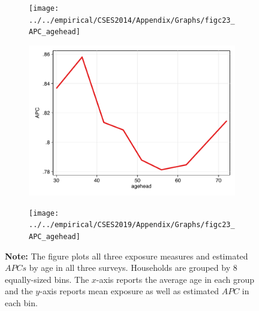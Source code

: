 \documentclass[11pt,letterpaper]{article}
\begin{document}
\begin{figure}
			\begin{subfigure}{.33\textwidth}
				\centering
				\texttt{[image: ../../empirical/CSES2014/Appendix/Graphs/figc23\_APC\_agehead]} 
				\vspace{-2.5em}
				\newline {}
			\end{subfigure}
			\begin{subfigure}{.33\textwidth}
				\centering
				\includegraphics[width=1\linewidth]{../../empirical/CSES2017/Appendix/Graphs/figc23_APC_agehead} 
				\vspace{-2.5em}
				\newline {}
			\end{subfigure}
			\begin{subfigure}{.33\textwidth}
				\centering
				\texttt{[image: ../../empirical/CSES2019/Appendix/Graphs/figc23\_APC\_agehead]} 
				\vspace{-2.5em}
				\newline {}
				
			\end{subfigure}
			
			
			\begin{tablenotes}
				\footnotesize
				\item \textbf{Note:} The figure plots all three exposure measures and estimated $APCs$ by age in all three surveys. Households are grouped by 8 equally-sized bins. The $x$-axis reports the average age in each group and the $y$-axis reports mean exposure as well as estimated $APC$ in each bin.
				
			\end{tablenotes} 
		\end{figure}
\end{document}

